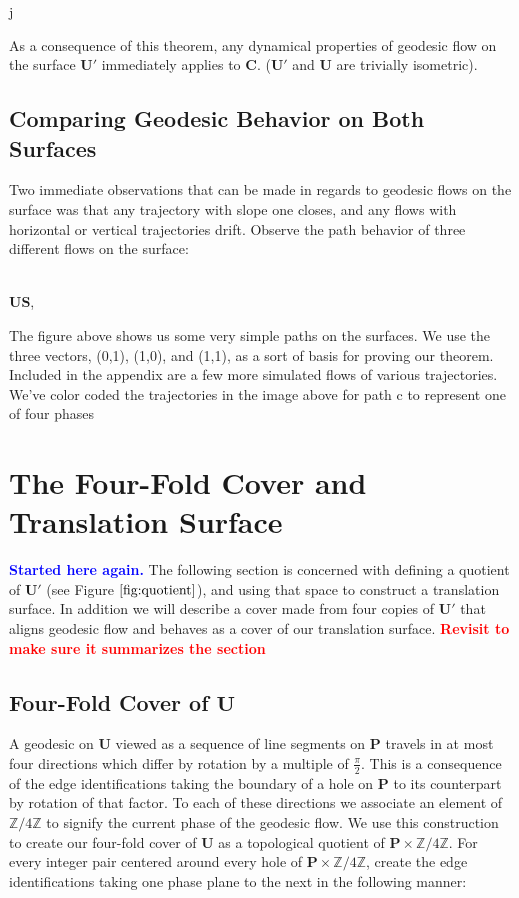 j\documentclass[]{article}
\newcommand{\compav}[1]{\textbf{\textcolor{blue}{#1}}}
\newcommand{\compat}[1]{\textbf{\textcolor{red}{#1}}}
\begin{document}
As a consequence of this theorem, any dynamical properties of geodesic flow on the surface $\mathbf{U}'$ immediately applies to $\mathbf{C}$. ($\mathbf{U}'$ and $\mathbf{U}$ are trivially isometric).

\subsection{Comparing Geodesic Behavior on Both Surfaces}
Two immediate observations that can be made in regards to geodesic flows on the surface was that any trajectory with slope one closes, and any flows with horizontal or vertical trajectories drift. Observe the path behavior of three different flows on the surface:

\begin{center}
\hspace{0.1in}
\raisebox{0.5in}{}
\\ $\mathbf{U}$$\mathbf{S}$,
\\ 
\end{center}

The figure above shows us some very simple paths on the surfaces. We use the three vectors, (0,1), (1,0), and (1,1), as a sort of basis for proving our theorem. Included in the appendix are a few more simulated flows of various trajectories. We've color coded the trajectories in the image above for path c to represent one of four phases

\newpage
\section{The Four-Fold Cover and Translation Surface}
\compav{Started here again.}
The following section is concerned with defining a quotient of $\mathbf{U}'$ (see Figure $\ref{fig:quotient}$), and using that space to construct a translation surface. In addition we will describe a cover made from four copies of $\mathbf{U}'$ that aligns geodesic flow and behaves as a cover of our translation surface. \compat{Revisit to make sure it summarizes the section}


\subsection{Four-Fold Cover of $\mathbf{U}$}
A geodesic on $\mathbf{U}$ viewed as a sequence of line segments on $\mathbf{P}$ travels in at most four directions which differ by rotation by a multiple of $\frac{\pi}{2}$. This is a consequence of the edge identifications taking the boundary of a hole on $\mathbf{P}$ to its counterpart by rotation of that factor. To each of these directions we associate an element of $\mathbb{Z}/4\mathbb{Z}$ to signify the current phase of the geodesic flow. We use this construction to create our four-fold cover of $\mathbf{U}$ as a topological quotient of $\mathbf{P}\times\mathbb{Z}/4\mathbb{Z}$. For every integer pair centered around every hole of $\mathbf{P}\times\mathbb{Z}/4\mathbb{Z}$, create the edge identifications taking one phase plane to the next in the following manner:
\end{document}
